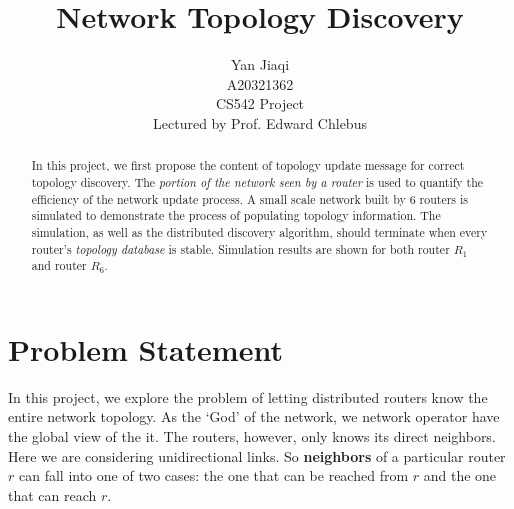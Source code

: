 \documentclass[12pt]{article}  %
\title{Network Topology Discovery}
\author{Yan Jiaqi\\
A20321362\\
CS542 Project\\
Lectured by Prof. Edward Chlebus}
\theoremstyle{definition}
\theoremstyle{remark}
\begin{document}
\maketitle

\begin{abstract}
In this project, we first propose the content of topology update message for correct topology discovery.
The \textit{portion of the network seen by a router} is used to quantify the efficiency of the network update process.
A small scale network built by 6 routers is simulated to demonstrate the process of populating topology information.
The simulation, as well as the distributed discovery algorithm, should terminate when every router's \textit{topology database} is stable.
Simulation results are shown for both router $R_1$ and router $R_6$.
\end{abstract}

\newpage                     %
\tableofcontents

\newpage                     %
\section{Problem Statement}\label{s:intro}
%

In this project, we explore the problem of letting distributed routers know the entire network topology.
As the `God' of the network, we network operator have the global view of the it.
The routers, however, only knows its direct neighbors. 
Here we are considering unidirectional links.
So \textbf{neighbors} of a particular router $r$ can fall into one of two cases: the one that can be reached from $r$ and the one that can reach $r$.
\end{document}
